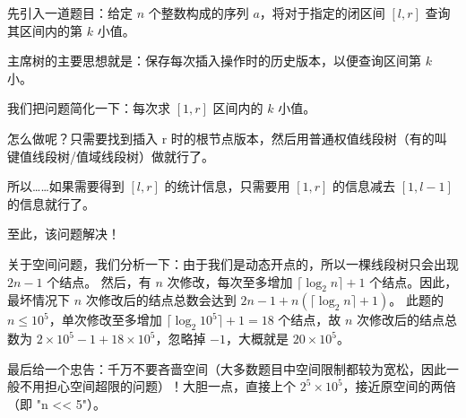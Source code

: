 先引入一道题目：给定 $n$ 个整数构成的序列 $a$，将对于指定的闭区间 $[l, r]$ 查询其区间内的第 $k$ 小值。

主席树的主要思想就是：保存每次插入操作时的历史版本，以便查询区间第 $k$ 小。

我们把问题简化一下：每次求 $[1,r]$ 区间内的 $k$ 小值。  

怎么做呢？只需要找到插入 r 时的根节点版本，然后用普通权值线段树（有的叫键值线段树/值域线段树）做就行了。

所以……如果需要得到 $[l,r]$ 的统计信息，只需要用 $[1,r]$ 的信息减去 $[1,l - 1]$ 的信息就行了。

至此，该问题解决！

关于空间问题，我们分析一下：由于我们是动态开点的，所以一棵线段树只会出现 $2n-1$ 个结点。  
然后，有 $n$ 次修改，每次至多增加 $\lceil\log_2{n}\rceil+1$ 个结点。因此，最坏情况下 $n$ 次修改后的结点总数会达到 $2n-1+n(\lceil\log_2{n}\rceil+1)$。
此题的 $n \leq 10^5$，单次修改至多增加 $\lceil\log_2{10^5}\rceil+1 = 18$ 个结点，故 $n$ 次修改后的结点总数为 $2\times 10^5-1+18\times 10^5$，忽略掉 $-1$，大概就是 $20\times 10^5$。

最后给一个忠告：千万不要吝啬空间（大多数题目中空间限制都较为宽松，因此一般不用担心空间超限的问题）！大胆一点，直接上个 $2^5\times 10^5$，接近原空间的两倍（即 "n << 5"）。


